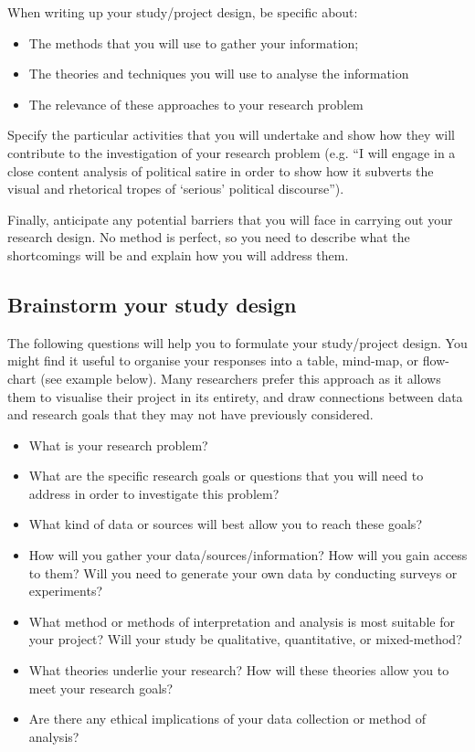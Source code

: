 \documentclass[12pt, a4paper]{article}
\begin{document}
When writing up your study/project design, be specific about:
\begin{itemize}
\item The methods that you will use to gather your information;
\item The theories and techniques you will use to analyse the information
\item The relevance of these approaches to your research problem
\end{itemize}

Specify the particular activities that you will undertake and show how they will contribute to the investigation of your research problem (e.g. “I will engage in a close content analysis of political satire in order to show how it subverts the visual and rhetorical tropes of ‘serious’ political discourse”).

Finally, anticipate any potential barriers that you will face in carrying out your research design. No method is perfect, so you need to describe what the shortcomings will be and explain how you will address them.

\subsection{Brainstorm your study design}

The following questions will help you to formulate your study/project design. You might find it useful to organise your responses into a table, mind-map, or flow-chart (see example below). Many researchers prefer this approach as it allows them to visualise their project in its entirety, and draw connections between data and research goals that they may not have previously considered.
\begin{itemize}
\item What is your research problem?
\item What are the specific research goals or questions that you will need to address in order to investigate this problem?
\item What kind of data or sources will best allow you to reach these goals?
\item How will you gather your data/sources/information? How will you gain access to them? Will you need to generate your own data by conducting surveys or experiments?
\item What method or methods of interpretation and analysis is most suitable for your project? Will your study be qualitative, quantitative, or mixed-method?
\item What theories underlie your research? How will these theories allow you to meet your research goals?
\item Are there any ethical implications of your data collection or method of analysis?
\end{itemize}
\end{document}
